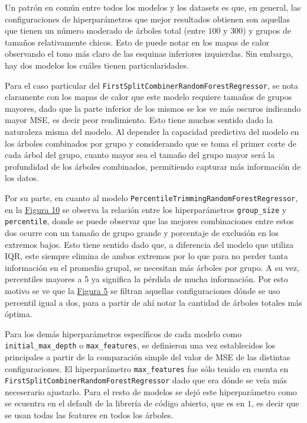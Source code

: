 Un patrón en común entre todos los modelos y los datasets es que, en general, las configuraciones de hiperparámetros que mejor resultados obtienen son aquellas que tienen un número moderado de árboles total (entre $100$ y $300$) y grupos de tamaños relativamente chicos. Esto de puede notar en los mapas de calor observando el tono más claro de las esquinas inferiores izquierdas. Sin embargo, hay dos modelos los cuáles tienen particularidades.

Para el caso particular del \texttt{FirstSplitCombinerRandomForestRegressor}, se nota claramente con los mapas de calor que este modelo requiere tamaños de grupos mayores, dado que la parte inferior de los mismos se los ve más oscuros indicando mayor MSE, es decir peor rendimiento. Esto tiene muchos sentido dado la naturaleza misma del modelo. Al depender la capacidad predictiva del modelo en los árboles combinados por grupo y considerando que se toma el primer corte de cada árbol del grupo, cuanto mayor sea el tamaño del grupo mayor será la profundidad de los árboles combinados, permitiendo capturar más información de los datos.

Por su parte, en cuanto al modelo \texttt{PercentileTrimmingRandomForestRegressor}, en la \hyperref[figure10]{Figura 10} se observa la relación entre los hiperparámetros \texttt{group\_size} y \texttt{percentile}, donde se puede observar que las mejores combinaciones entre estos dos ocurre con un tamaño de grupo grande y porcentaje de exclusión en los extremos bajos. Esto tiene sentido dado que, a diferencia del modelo que utiliza IQR, este siempre elimina de ambos extremos por lo que para no perder tanta información en el promedio grupal, se necesitan más árboles por grupo. A su vez, percentiles mayores a 5 ya significa la pérdida de mucha información. Por esto motivo se ve que la \hyperref[figure5]{Figura 5} se filtran aquellas configuraciones dónde se uso percentil igual a dos, para a partir de ahí notar la cantidad de árboles totales más óptima.

Para los demás hiperparámetros específicos de cada modelo como \texttt{initial\_max\_depth} o \texttt{max\_features}, se definieron una vez establecidos los principales a partir de la  comparación simple del valor de MSE de las distintas configuraciones. El hiperparámetro \texttt{max\_features} fue sólo tenido en cuenta en \texttt{FirstSplitCombinerRandomForestRegressor} dado que era dónde se veía más neceserario ajustarlo. Para el resto de modelos se dejó este hiperparámetro como se ecuentra en el default de la librería de código abierto, que es en $1$, es decir que se usan todas las features en todos los árboles. 

